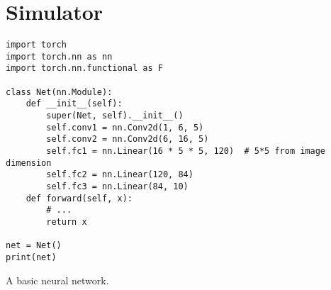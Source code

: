 \chapter{Simulator}\label{app:Simulator}
\lipsum[1]
\begin{listing}[H]
\begin{verbatim}
import torch
import torch.nn as nn
import torch.nn.functional as F

class Net(nn.Module):
    def __init__(self):
        super(Net, self).__init__()
        self.conv1 = nn.Conv2d(1, 6, 5)
        self.conv2 = nn.Conv2d(6, 16, 5)
        self.fc1 = nn.Linear(16 * 5 * 5, 120)  # 5*5 from image dimension
        self.fc2 = nn.Linear(120, 84)
        self.fc3 = nn.Linear(84, 10)
    def forward(self, x):
        # ...
        return x

net = Net()
print(net)
\end{verbatim}
\caption{A basic neural network.}
\end{listing}
\lipsum[1]